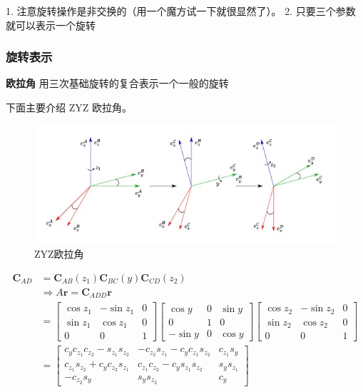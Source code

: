 \documentclass[11pt]{ctexart}
\begin{document}
1. 注意旋转操作是非交换的（用一个魔方试一下就很显然了）。
2. 只要三个参数就可以表示一个旋转

\subsubsection{旋转表示}

\noindent\textbf{欧拉角}
用三次基础旋转的复合表示一个一般的旋转

下面主要介绍 ZYZ 欧拉角。
\begin{figure}[ht]
    \centering
    \includegraphics{images/3.jpg}
    \caption{ZYZ欧拉角}
    \label{label3}
\end{figure}

\begin{equation}
    \begin{split}
        \mathbf{C}_{A D} &= \mathbf{C}_{A B}\left(z_{1}\right)\mathbf{C}_{B C}\left(y\right)\mathbf{C}_{C D}\left(z_{2}\right) \\
        &\Rightarrow A\mathbf{r} = \mathbf{C}_{A D D}\mathbf{r} \\
        &= \left[\begin{array}{ccc}\cos z_1&-\sin z_1&0\\\sin z_1&\cos z_1&0\\0&0&1\end{array}\right]
        \left[\begin{array}{ccc}\cos y&0&\sin y\\0&1&0\\-\sin y&0&\cos y\end{array}\right]
        \left[\begin{array}{ccc}\cos z_2&-\sin z_2&0\\\sin z_2&\cos z_2&0\\0&0&1\end{array}\right] \\
        &= \left[\begin{array}{ccc}
        c_yc_{z_1}c_{z_2}-s_{z_1}s_{z_2}&-c_{z_2}s_{z_1}-c_yc_{z_1}s_{z_2}&c_{z_1}s_y \\
        c_{z_1}s_{z_2}+c_yc_{z_2}s_{z_1}&c_{z_1}c_{z_2}-c_ys_{z_1}s_{z_2}&s_ys_{z_1} \\
        -c_{z_2}s_y&s_ys_{z_2}&c_y
        \end{array}\right]
    \end{split}
    \end{equation}
\end{document}
